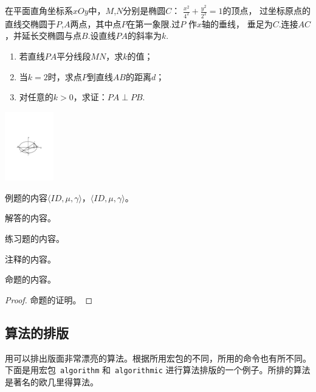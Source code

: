 \begin{example}[2011\ 江苏卷]在平面直角坐标系$xOy$中，$M$,$N$分别是椭圆$C$：
	$\frac{x^{2}}{4^{2}}+\frac{y^{2}}{2^{2}}=1$的顶点，
	过坐标原点的直线交椭圆于$P$,$A$两点，其中点$P$在第一象限.过$P$ 作$x$轴的垂线，
	垂足为$C$.连接$AC$，并延长交椭圆与点$B$.设直线$PA$的斜率为$k$.\\
	\parbox{10cm}{
		\begin{enumerate}
			\item 若直线$PA$平分线段$MN$，求$k$的值；
			\item 当$k=2$时，求点$P$到直线$AB$的距离$d$；
			\item 对任意的$k>0$，求证：$PA\perp PB$.
	\end{enumerate}}
	\parbox{3cm}{
		\begin{center}
			\includegraphics[height=3cm,angle=0]{wangyang_2.pdf}\\
	\end{center}}
\end{example}

\begin{example}[2010，重庆卷]
	例题的内容$\langle ID,\mu,\gamma\rangle$，$\langle ID,\mu,\gamma\rangle$。
\end{example}
\begin{solution}
	解答的内容。
\end{solution}
\begin{exercise}
	练习题的内容。
\end{exercise}
\begin{note}
	注释的内容。
\end{note}
\begin{proposition}
	命题的内容。
\end{proposition}
\begin{proof}
	命题的证明。
\end{proof}

\subsection{算法的排版\index{}}
用\CTeX 可以排出版面非常漂亮的算法。根据所用宏包的不同，所用的命令也有所不同。下面是用宏包~{\tt algorithm} 和~{\tt algorithmic} 进行算法排版的一个例子。所排的算法是著名的欧几里得算法。

